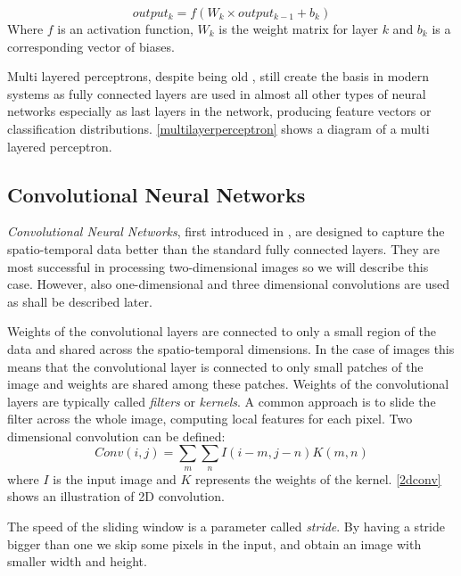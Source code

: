$$output_k = f(W_k \times output_{k-1} + b_k)$$
Where $f$ is an activation function, $W_k$ is the weight matrix for layer $k$ and $b_k$ is a corresponding vector of biases.\par  
Multi layered perceptrons, despite being old \cite{rosenblatt_principles_1961}, still create the basis in modern systems as fully connected layers are used in almost all other types of neural networks especially as last layers in the network, producing feature vectors or classification distributions. \autoref{multilayerperceptron} shows a diagram of a multi layered perceptron.



\subsection{Convolutional Neural Networks}
\textit{Convolutional Neural Networks}, first introduced in \cite{lecun_backpropagation_1989}, are designed to capture the spatio-temporal data better than the standard fully connected layers. They are most successful in processing two-dimensional images so we will describe this case. However, also one-dimensional and three dimensional convolutions are used as shall be described later.  \par
Weights of the convolutional layers are connected to only a small region of the data and shared across the spatio-temporal dimensions. In the case of images this means that the convolutional layer is connected to only small patches of the image and weights are shared among these patches. Weights of the convolutional layers are typically called \textit{filters} or \textit{kernels}. A common approach is to slide the filter across the whole image,  computing local features for each pixel.
Two dimensional convolution can be defined:
$$Conv(i,j) = \sum_m {\sum_n {I(i-m,j-n)K(m,n)}}$$ where $I$ is the input image and $K$ represents the weights of the kernel. \autoref{2dconv} shows an illustration of 2D convolution. \par
The speed of the sliding window is a parameter called \textit{stride}. By having a stride bigger than one we skip some pixels in the input, and obtain an image with smaller width and height.\par 




